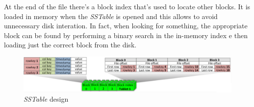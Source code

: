 At the end of the file there's a block index that's used to locate other blocks.
It is loaded in memory when the \emph{SSTable} is opened and this allows to
avoid unnecessary disk interation. In fact, when looking for something,
the appropriate block can be found by performing a binary search in the in-memory
index e then loading just the correct block from the disk.

\begin{figure}[ht!]
    \centering
    \includegraphics[width=\textwidth]{images/sstable-format.png}
    \caption{\emph{SSTable} design}
\end{figure}

